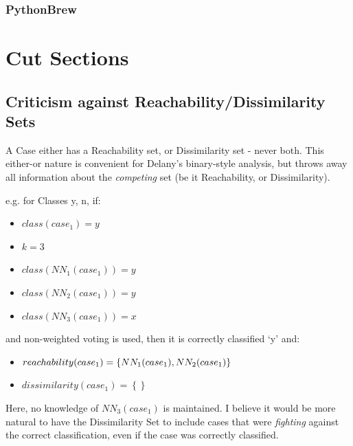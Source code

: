 \documentclass[a4paper,11pt]{report}
\begin{document}
\subsubsection*{PythonBrew}

\section{Cut Sections}
\subsection{Criticism against Reachability/Dissimilarity Sets}
A Case either has a Reachability set, or Dissimilarity set - never both. This either-or nature is convenient for Delany's binary-style analysis, but throws away all information about the \emph{competing} set (be it Reachability, or Dissimilarity).

e.g. for Classes {y, n}, if:
\begin{itemize}
	\item $class(case_{1})=y$ 
	\item $k = 3$
	\item $class(NN_{1}(case_{1})) = y$ 
	\item $class(NN_{2}(case_{1})) = y$
	\item $class(NN_{3}(case_{1})) = x$  
\end{itemize}
and non-weighted voting is used, then it is correctly classified `y' and:
\begin{itemize}
	\item $reachability(case_{1})=\left\{ NN_{1}(case_{1}),\hphantom{}NN_{2}(case_{1})\right\} $
	\item $dissimilarity(case_{1})=\left\{ \right\} $
\end{itemize}

Here, no knowledge of $NN_{3}(case_{1})$ is maintained. I believe it would be more natural to have the Dissimilarity Set to include cases that were \emph{fighting} against the correct classification, even if the case was correctly classified.



\end{document}
